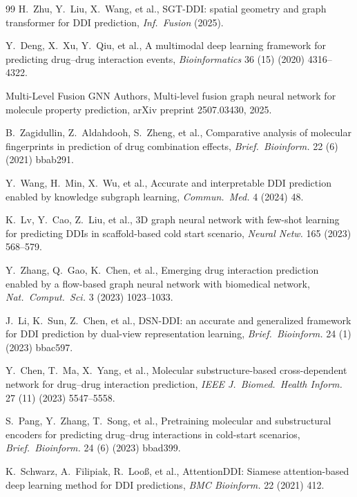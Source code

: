 \documentclass[11pt,a4paper,twocolumn]{article}
\begin{document}
\begin{thebibliography}{99}
H.\ Zhu, Y.\ Liu, X.\ Wang, et al.,
SGT-DDI: spatial geometry and graph transformer for DDI prediction,
\emph{Inf.\ Fusion} (2025).

Y.\ Deng, X.\ Xu, Y.\ Qiu, et al.,
A multimodal deep learning framework for predicting drug--drug interaction events,
\emph{Bioinformatics} 36 (15) (2020) 4316--4322.

Multi-Level Fusion GNN Authors,
Multi-level fusion graph neural network for molecule property prediction,
arXiv preprint 2507.03430, 2025.

B.\ Zagidullin, Z.\ Aldahdooh, S.\ Zheng, et al.,
Comparative analysis of molecular fingerprints in prediction of drug combination effects,
\emph{Brief.\ Bioinform.} 22 (6) (2021) bbab291.

Y.\ Wang, H.\ Min, X.\ Wu, et al.,
Accurate and interpretable DDI prediction enabled by knowledge subgraph learning,
\emph{Commun.\ Med.} 4 (2024) 48.

K.\ Lv, Y.\ Cao, Z.\ Liu, et al.,
3D graph neural network with few-shot learning for predicting DDIs in scaffold-based cold start scenario,
\emph{Neural Netw.} 165 (2023) 568--579.

Y.\ Zhang, Q.\ Gao, K.\ Chen, et al.,
Emerging drug interaction prediction enabled by a flow-based graph neural network with biomedical network,
\emph{Nat.\ Comput.\ Sci.} 3 (2023) 1023--1033.

J.\ Li, K.\ Sun, Z.\ Chen, et al.,
DSN-DDI: an accurate and generalized framework for DDI prediction by dual-view representation learning,
\emph{Brief.\ Bioinform.} 24 (1) (2023) bbac597.

Y.\ Chen, T.\ Ma, X.\ Yang, et al.,
Molecular substructure-based cross-dependent network for drug--drug interaction prediction,
\emph{IEEE J.\ Biomed.\ Health Inform.} 27 (11) (2023) 5547--5558.

S.\ Pang, Y.\ Zhang, T.\ Song, et al.,
Pretraining molecular and substructural encoders for predicting drug--drug interactions in cold-start scenarios,
\emph{Brief.\ Bioinform.} 24 (6) (2023) bbad399.

K.\ Schwarz, A.\ Filipiak, R.\ Loo\ss, et al.,
AttentionDDI: Siamese attention-based deep learning method for DDI predictions,
\emph{BMC Bioinform.} 22 (2021) 412.


\end{thebibliography}
\end{document}
